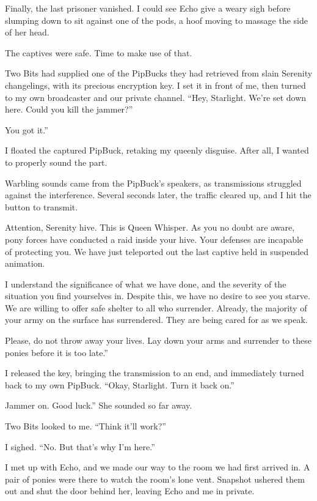Finally, the last prisoner vanished. I could see Echo give a weary sigh before slumping down to sit against one of the pods, a hoof moving to massage the side of her head.

The captives were safe. Time to make use of that.

Two Bits had supplied one of the PipBucks they had retrieved from slain Serenity changelings, with its precious encryption key. I set it in front of me, then turned to my own broadcaster and our private channel. “Hey, Starlight. We’re set down here. Could you kill the jammer?”

\leavevmode{}You got it.”

I floated the captured PipBuck, retaking my queenly disguise. After all, I wanted to properly sound the part.

Warbling sounds came from the PipBuck’s speakers, as transmissions struggled against the interference. Several seconds later, the traffic cleared up, and I hit the button to transmit.

\leavevmode{}Attention, Serenity hive. This is Queen Whisper. As you no doubt are aware, pony forces have conducted a raid inside your hive. Your defenses are incapable of protecting you. We have just teleported out the last captive held in suspended animation.

\leavevmode{}I understand the significance of what we have done, and the severity of the situation you find yourselves in. Despite this, we have no desire to see you starve. We are willing to offer safe shelter to all who surrender. Already, the majority of your army on the surface has surrendered. They are being cared for as we speak.

\leavevmode{}Please, do not throw away your lives. Lay down your arms and surrender to these ponies before it is too late.”

I released the key, bringing the transmission to an end, and immediately turned back to my own PipBuck. “Okay, Starlight. Turn it back on.”

\leavevmode{}Jammer on. Good luck.” She sounded so far away.

Two Bits looked to me. “Think it’ll work?”

I sighed. “No. But that’s why I’m here.”

I met up with Echo, and we made our way to the room we had first arrived in. A pair of ponies were there to watch the room’s lone vent. Snapshot ushered them out and shut the door behind her, leaving Echo and me in private.

